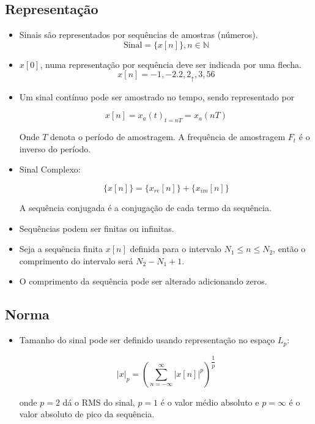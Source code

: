 \subsection{Representação}
\begin{itemize}
    \item Sinais são representados por sequências de amostras (números).
    \[\text{Sinal} = \{x[n]\}, n \in \mathbb{N} \]

    \item $x[0]$, numa representação por sequência deve ser indicada por uma flecha.
    \[x[n] = -1, -2.2, 2_{\uparrow}, 3, 56 \]

    \item Um sinal contínuo pode ser amostrado no tempo, sendo representado por
    
    \[x[n] = x_{a}(t)_{t = nT} = x_{a}(nT) \]

    Onde $T$ denota o período de amostragem. A frequência de amostragem $F_{t}$ é o inverso do período.

    \item Sinal Complexo:
    
    \[\{x[n]\} = \{x_{re}[n]\} + \{x_{im}[n]\} \]
    
    A sequência conjugada é a conjugação de cada termo da sequência.

    \item Sequências podem ser finitas ou infinitas. 
    \item Seja a sequência finita $x[n]$ definida para o intervalo $ N_{1} \leq n \leq N_{2} $, então o comprimento do intervalo será $N_{2} - N_{1} + 1$.

    \item O comprimento da sequência pode ser alterado adicionando zeros.
    
\end{itemize}

\subsection{Norma}
\begin{itemize}
    \item Tamanho do sinal pode ser definido usando representação no espaço $L_{p}$:
    
    \[|x|_{p} = (\sum_{n = - \infty}^{\infty} |x[n]|^{p})^{\dfrac{1}{p}}\]

    onde $p = 2$ dá o RMS do sinal, $p = 1$ é o valor médio absoluto e $p = \infty$ é o valor absoluto de pico da sequência.

\end{itemize}
